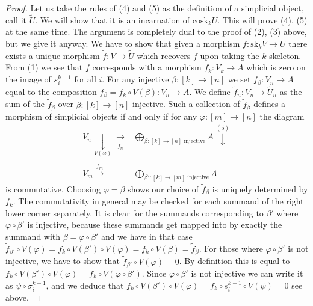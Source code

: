 \begin{proof}
\medskip\noindent
Let us take the rules of (4) and (5)
as the definition of a simplicial object, call it $\tilde U$.
We will show that it is an incarnation of $\text{cosk}_k U$.
This will prove (4), (5) at the same time. The argument is completely dual
to the proof of (2), (3) above, but we give it anyway.
We have to show
that given a morphism $f : \text{sk}_kV \to U$
there exists a unique morphism $\tilde f : V \to \tilde U$
which recovers $f$ upon taking the $k$-skeleton.
From (1) we see that $f$ corresponds with a morphism
$f_k : V_k \to A$ which is zero on the image of $s^{k - 1}_i$
for all $i$. For any injective $\beta : [k] \to [n]$
we set $\tilde f_\beta : V_n \to A$ equal to the composition
$\tilde f_\beta = f_k \circ V(\beta) : V_n \to A$. We define
$\tilde f_n : V_n \to \tilde U_n$ as the sum of
the $\tilde f_\beta$ over $\beta : [k] \to [n]$ injective.
Such a collection of $\tilde f_\beta$ defines a morphism
of simplicial objects if and only if
for any $\varphi : [m] \to [n]$ the diagram
$$
\begin{array}{cc}V_n
\underset{V(\varphi)}{\downarrow}\underset{\tilde f_n}{\longrightarrow} & \bigoplus_{\beta : [k] \to [n]\text{ injective}} A
\overset{(5)}{\downarrow} \\ V_m
\overset{\tilde f_m}{\longrightarrow} & \bigoplus_{\beta' : [k] \to [m]\text{ injective}} A\end{array}
$$
is commutative. Choosing $\varphi = \beta$ shows our choice of
$\tilde f_\beta$ is uniquely determined by $f_k$.
The commutativity in general may be checked for each summand
of the right lower corner separately. It is clear for the
summands corresponding to $\beta'$ where
$\varphi \circ \beta'$ is injective, because these summands
get mapped into by exactly the summand with
$\beta = \varphi \circ \beta'$ and we have in that case
$\tilde f_{\beta'} \circ V(\varphi) =
f_k \circ V(\beta') \circ V(\varphi) =
f_k \circ V(\beta) = \tilde f_\beta$. For those where
$\varphi \circ \beta'$ is not injective,
we have to show that $\tilde f_{\beta'} \circ V(\varphi) = 0$.
By definition this is equal to
$f_k \circ V(\beta') \circ V(\varphi) =
f_k \circ V(\varphi \circ \beta')$.
Since $\varphi \circ \beta'$ is not injective we can write it
as $\psi \circ \sigma^{k - 1}_i$, and we deduce that
$f_k \circ V(\beta') \circ V(\varphi) =
f_k \circ s^{k - 1}_i \circ V(\psi) = 0$ see above.


\end{proof}
